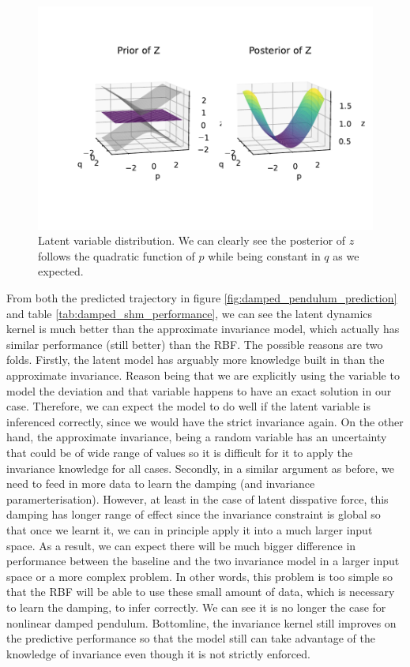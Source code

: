 \documentclass{statsmsc}
\begin{document}
\begin{figure}[H] 
  \includegraphics[width=0.8\linewidth]{../codes/figures/latent_damped_shm.pdf}
  \centering
  \caption{Latent variable distribution. We can clearly see the posterior of $z$ follows the quadratic function of $p$ while being constant in $q$ as we expected.}
  \label{fig:latent_damped_shm}
\end{figure}

From both the predicted trajectory in figure \ref{fig:damped_pendulum_prediction} and table \ref{tab:damped_shm_performance}, we can see the latent dynamics kernel is much better than the approximate invariance model, which actually has similar performance (still better) than the RBF. 
The possible reasons are two folds.
Firstly, the latent model has arguably more knowledge built in than the approximate invariance. Reason being that we are explicitly using the variable to model the deviation and that variable happens to have an exact solution in our case.
Therefore, we can expect the model to do well if the latent variable is inferenced correctly, since we would have the strict invariance again.
On the other hand, the approximate invariance, being a random variable has an uncertainty that could be of wide range of values so it is difficult for it to apply the invariance knowledge for all cases.
Secondly, in a similar argument as before, we need to feed in more data to learn the damping (and invariance paramerterisation).
However, at least in the case of latent disspative force, this damping has longer range of effect since the invariance constraint is global so that once we learnt it, we can in principle apply it into a much larger input space.
As a result, we can expect there will be much bigger difference in performance between the baseline and the two invariance model in a larger input space or a more complex problem.
In other words, this problem is too simple so that the RBF will be able to use these small amount of data, which is necessary to learn the damping, to infer correctly. 
We can see it is no longer the case for nonlinear damped pendulum.
Bottomline, the invariance kernel still improves on the predictive performance so that the model still can take advantage of the knowledge of invariance even though it is not strictly enforced. 
\end{document}

